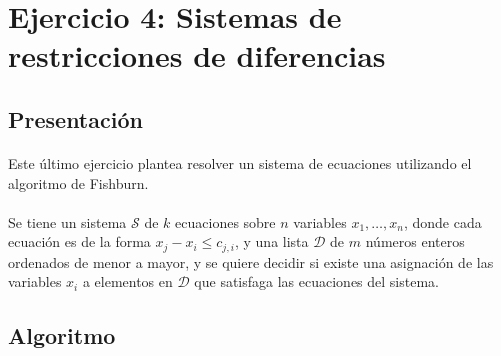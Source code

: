 \documentclass[../main.tex]{subfiles}
\begin{document}
\section{Ejercicio 4: Sistemas de restricciones de diferencias}

\subsection{Presentación}
\label{sec:ej4-intro}
\paragraph{} Este último ejercicio plantea resolver un sistema de ecuaciones utilizando el algoritmo de Fishburn.

\paragraph{} Se tiene un sistema \(\mathcal{S}\) de \(k\) ecuaciones sobre \(n\) variables \(x_{1}, \ldots, x_{n}\), donde cada ecuación es de la forma \(x_{j} - x_{i} \leq c_{j,i}\), y una lista \(\mathcal{D}\) de \(m\) números enteros ordenados de menor a mayor, y se quiere decidir si existe una asignación de las variables \(x_{i}\) a elementos en \(\mathcal{D}\) que satisfaga las ecuaciones del sistema.

\subsection{Algoritmo}
\label{sec:ej4-algo}
\end{document}

